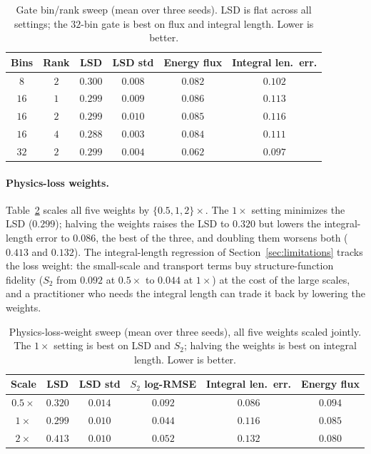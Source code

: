 \documentclass[10pt]{article} %
\begin{document}
\begin{table}[H]
\centering
\caption{Gate bin/rank sweep (mean over three seeds). LSD is flat across all settings; the $32$-bin gate is best on flux and integral length. Lower is better.}
\label{tab:gatesweep}
\begin{tabular}{cccccc}
\toprule
Bins & Rank & LSD & LSD std & Energy flux & Integral len.\ err. \\
\midrule
$8$  & $2$ & $0.300$ & $0.008$ & $0.082$ & $0.102$ \\
$16$ & $1$ & $0.299$ & $0.009$ & $0.086$ & $0.113$ \\
$16$ & $2$ & $0.299$ & $0.010$ & $0.085$ & $0.116$ \\
$16$ & $4$ & $\mathbf{0.288}$ & $0.003$ & $0.084$ & $0.111$ \\
$32$ & $2$ & $0.299$ & $0.004$ & $\mathbf{0.062}$ & $\mathbf{0.097}$ \\
\bottomrule
\end{tabular}
\end{table}

\paragraph{Physics-loss weights.} Table~\ref{tab:lambdasweep} scales all five weights by $\{0.5, 1, 2\}\times$. The $1\times$ setting minimizes the LSD ($0.299$); halving the weights raises the LSD to $0.320$ but lowers the integral-length error to $0.086$, the best of the three, and doubling them worsens both ($0.413$ and $0.132$). The integral-length regression of Section~\ref{sec:limitations} tracks the loss weight: the small-scale and transport terms buy structure-function fidelity ($S_2$ from $0.092$ at $0.5\times$ to $0.044$ at $1\times$) at the cost of the large scales, and a practitioner who needs the integral length can trade it back by lowering the weights.

\begin{table}[H]
\centering
\caption{Physics-loss-weight sweep (mean over three seeds), all five weights scaled jointly. The $1\times$ setting is best on LSD and $S_2$; halving the weights is best on integral length. Lower is better.}
\label{tab:lambdasweep}
\begin{tabular}{cccccc}
\toprule
Scale & LSD & LSD std & $S_2$ log-RMSE & Integral len.\ err. & Energy flux \\
\midrule
$0.5\times$ & $0.320$ & $0.014$ & $0.092$ & $\mathbf{0.086}$ & $0.094$ \\
$1\times$   & $\mathbf{0.299}$ & $0.010$ & $\mathbf{0.044}$ & $0.116$ & $0.085$ \\
$2\times$   & $0.413$ & $0.010$ & $0.052$ & $0.132$ & $\mathbf{0.080}$ \\
\bottomrule
\end{tabular}
\end{table}
\end{document}
